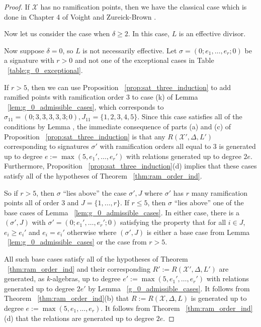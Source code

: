 \documentclass{amsart}
\theoremstyle{plain}
\theoremstyle{definition}
\theoremstyle{remark}
\numberwithin{equation}{section}
\newcommand \sx{\mathscr X}
\newcommand \halfcan{L}
\begin{document}
\begin{proof}
If $\sx$ has no ramification points, then we have the classical
case which is done in Chapter 4 of Voight and Zureick-Brown
\cite{vzb:stacky}.

Now let us consider the case when $\delta \geq 2$. In this case,
$\halfcan$ is an effective divisor. 

Now suppose $\delta = 0$, so $\halfcan$ is not necessarily effective.
Let $\sigma = (0; e_1, \ldots, e_r; 0)$ be a signature with $r > 0$
and not one of the exceptional cases in Table
~\ref{table:g_0_exceptional}.

If $r > 5$, then we can use Proposition
~\ref{prop:sat_three_induction} to add ramified points with
ramification order $3$ to case (k) of Lemma
~\ref{lem:g_0_admissible_cases}, which corresponds to $\sigma_{11}
= (0; 3, 3, 3, 3, 3; 0), J_{11} = \{1, 2, 3, 4, 5\}$. Since
this case satisfies all of the conditions by Lemma , the
immediate consequence of parts (a) and (c) of Proposition
~\ref{prop:sat_three_induction} is that any $R(\sx', \Delta,
\halfcan')$ corresponding to signatures $\sigma'$ with ramification
orders all equal to $3$ is generated up to degree $e := \max(5, e_1',
\ldots, e_r')$ with relations generated up to degree $2e$.
Furthermore, Proposition ~\ref{prop:sat_three_induction}(d)
implies that these cases satisfy all of the hypotheses of Theorem
~\ref{thm:ram_order_ind}.

So if $r > 5$, then $\sigma$ ``lies above'' the case $\sigma', J$
where $\sigma'$ has $r$ many ramification points all of order $3$
and $J = \{1, \ldots, r\}$. If $r \leq 5$, then $\sigma$ ``lies
above'' one of the base cases of Lemma ~\ref{lem:g_0_admissible_cases}.
In either case, there is a $(\sigma', J)$ with $\sigma' = (0; e_1',
\ldots, e_r'; 0)$ satisfying the property that for all $i \in J$,
$e_i \geq e_i'$ and $e_i = e_i'$ otherwise where $(\sigma', J)$
is either a base case from Lemma ~\ref{lem:g_0_admissible_cases}
or the case from $r > 5$.

All such base cases satisfy all of the hypotheses of
Theorem ~\ref{thm:ram_order_ind} and their corresponding $R' :=
R(\sx', \Delta, \halfcan')$ are generated, as $k$-algebras, up
to degree $e' := \max(5, e_1', \ldots, e_r')$ with relations
generated up to degree $2e'$ by Lemma ~\ref{g_0_admissible_cases}.
It follows from Theorem ~\ref{thm:ram_order_ind}(b) that $R :=
R(\sx, \Delta, \halfcan)$ is generated up to degree $e := \max(5,
e_1, \ldots, e_r)$. It follows from Theorem ~\ref{thm:ram_order_ind}
(d) that the relations are generated up to degree $2e$.



\end{proof}
\end{document}
